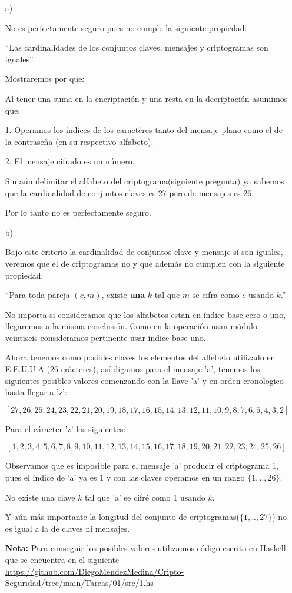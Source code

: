 \documentclass{article}
\begin{document}
\begin{enumerate}
\item[a)]

  No es perfectamente seguro pues no cumple la siguiente propiedad:

  ``Las cardinalidades de los conjuntos claves, mensajes y
  criptogramas son iguales''
  
  Mostraremos por que:
  
  Al tener una suma en la encriptación y una resta en la decriptación asumimos
  que:
  
  1. Operamos los índices de los caractéres tanto del mensaje plano como
  el de la contraseña (en su respectivo alfabeto).

  2. El mensaje cifrado es un número.

  Sin aún delimitar el alfabeto del criptograma(siguiente pregunta) ya sabemos
  que la cardinalidad de conjuntos claves es 27 pero de mensajes es 26.

  Por lo tanto no es perfectamente seguro.

\item[b)]
  
  Bajo este criterio la cardinalidad de conjuntos clave y mensaje sí son iguales,
  veremos que el de criptogramas no y que además no cumplen con la siguiente propiedad:

  ``Para toda pareja $(c, m)$, existe {\bf una} $k$ tal que $m$
  se cifra como $c$ usando $k$.''

  No importa si consideramos que los alfabetos estan en índice base cero o uno, llegaremos a
  la misma conclusión. Como en la operación usan módulo veintiseis consideramos
  pertinente usar índice base uno.

  Ahora tenemos como posibles claves los elementos del alfebeto utilizado en E.E.U.U.A
  (26 crácteres), así digamos para el mensaje 'a', tenemos los siguientes posibles valores
  comenzando con la llave 'a' y en orden cronologico hasta llegar a 'z':

  $$[27,26,25,24,23,22,21,20,19,18,17,16,15,14,13,12,11,10,9,8,7,6,5,4,3,2]$$

  Para el cáracter 'z' los siguientes:

  $$[1,2,3,4,5,6,7,8,9,10,11,12,13,14,15,16,17,18,19,20,21,22,23,24,25,26]$$

  Observamos que es imposible para el mensaje 'a' producir el criptograma $1$, pues
  el índice de 'a' ya es 1 y con las claves operamos en un rango $\{1,..,26\}$.

  No existe una clave $k$ tal que 'a' se cifré como 1 usando $k$.

  Y aún más importante la longitud del conjunto de criptogramas($\{1,..,27\}$)
  no es igual a la de claves ni mensajes.

  {\bf *Nota:} Para conseguir los posibles valores utilizamos código escrito en
  Haskell que se encuentra en el siguiente
  \href{enlace}{https://github.com/DiegoMendezMedina/Cripto-Seguridad/tree/main/Tareas/01/src/1.hs}
\end{enumerate}
\end{document}
